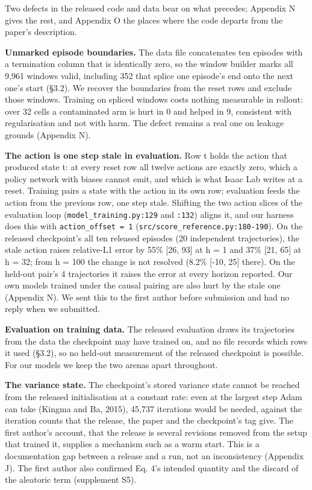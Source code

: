 \documentclass[10pt]{article}
\begin{document}
Two defects in the released code and data bear on what precedes; Appendix N gives the rest, and Appendix O the places where the code departs from the paper's description.

\textbf{Unmarked episode boundaries.} The data file concatenates ten episodes with a termination column that is identically zero, so the window builder marks all 9,961 windows valid, including 352 that splice one episode's end onto the next one's start (\S{}3.2). We recover the boundaries from the reset rows and exclude those windows. Training on spliced windows costs nothing measurable in rollout: over 32 cells a contaminated arm is hurt in 0 and helped in 9, consistent with regularisation and not with harm. The defect remains a real one on leakage grounds (Appendix N).

\textbf{The action is one step stale in evaluation.} Row t holds the action that produced state t: at every reset row all twelve actions are exactly zero, which a policy network with biases cannot emit, and which is what Isaac Lab writes at a reset. Training pairs a state with the action in its own row; evaluation feeds the action from the previous row, one step stale. Shifting the two action slices of the evaluation loop (\texttt{model\_training.py:129} and \texttt{:132}) aligns it, and our harness does this with \texttt{action\_offset = 1} (\texttt{src/\allowbreak{}score\_\allowbreak{}reference\allowbreak{}.py:180-190}). On the released checkpoint's all ten released episodes (20 independent trajectories), the stale action raises relative-L1 error by 55\% [26, 93] at h = 1 and 37\% [21, 65] at h = 32; from h = 100 the change is not resolved (8.2\% [-10, 25] there). On the held-out pair's 4 trajectories it raises the error at every horizon reported. Our own models trained under the causal pairing are also hurt by the stale one (Appendix N). We sent this to the first author before submission and had no reply when we submitted.

\textbf{Evaluation on training data.} The released evaluation draws its trajectories from the data the checkpoint may have trained on, and no file records which rows it used (\S{}3.2), so no held-out measurement of the released checkpoint is possible. For our models we keep the two arenas apart throughout.

\textbf{The variance state.} The checkpoint's stored variance state cannot be reached from the released initialisation at a constant rate: even at the largest step Adam can take (Kingma and Ba, 2015), 45,737 iterations would be needed, against the iteration counts that the release, the paper and the checkpoint's tag give. The first author's account, that the release is several revisions removed from the setup that trained it, supplies a mechanism such as a warm start. This is a documentation gap between a release and a run, not an inconsistency (Appendix J). The first author also confirmed Eq. 4's intended quantity and the discard of the aleatoric term (supplement S5).
\end{document}
